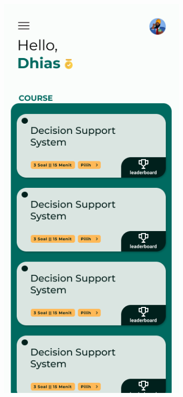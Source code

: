 \begin{figure}[H]
\begin{subfigure}[b]{0.3\textwidth}
	  \includegraphics[width=\linewidth]{contents/chapter-3/images/HF-QuizList.png}

\end{subfigure}
\end{figure}
